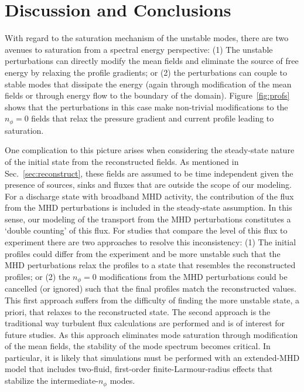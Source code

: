 \section{Discussion and Conclusions} 
\label{sec:conclusions}

With regard to the saturation mechanism of the unstable modes, there are two
avenues to saturation from a spectral energy perspective: (1) The unstable
perturbations can directly modify the mean fields and eliminate the source of
free energy by relaxing the profile gradients; or (2) the perturbations can
couple to stable modes that dissipate the energy (again through modification of
the mean fields or through energy flow to the boundary of the domain). 
Figure~\ref{fig:profs} shows that the perturbations in this case make
non-trivial modifications to the $n_\phi=0$ fields that relax the pressure
gradient and current profile leading to saturation. 

One complication to this picture arises when considering the steady-state
nature of the initial state from the reconstructed fields. As mentioned in
Sec.~\ref{sec:reconstruct}, these fields are assumed to be time independent
given the presence of sources, sinks and fluxes that are outside the scope of
our modeling. For a discharge state with broadband MHD activity, the
contribution of the flux from the MHD perturbations is included in the
steady-state assumption. In this sense, our modeling of the transport from the
MHD perturbations constitutes a `double counting' of this flux. For studies
that compare the level of this flux to experiment there are two approaches to
resolve this inconsistency: (1) The initial profiles could differ from the
experiment and be more unstable such that the MHD perturbations relax the
profiles to a state that resembles the reconstructed profiles; or (2) the
$n_\phi=0$ modifications from the MHD perturbations could be cancelled (or
ignored) such that the final profiles match the reconstructed values. This
first approach suffers from the difficulty of finding the more unstable state,
a priori, that relaxes to the reconstructed state.  The second approach is
the traditional way turbulent flux calculations are performed and is of interest
for future studies. As this approach eliminates mode saturation through
modification of the mean fields, the stability of the mode spectrum becomes
critical. In particular, it is likely that simulations must be performed with
an extended-MHD model that includes two-fluid, first-order
finite-Larmour-radius effects that stabilize the intermediate-$n_\phi$ modes.

